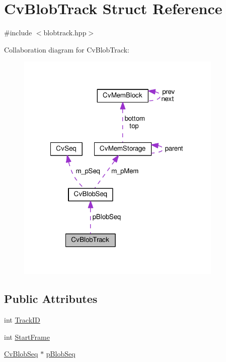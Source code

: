\hypertarget{structCvBlobTrack}{\section{Cv\-Blob\-Track Struct Reference}
\label{structCvBlobTrack}
}


{\ttfamily \#include $<$blobtrack.\-hpp$>$}



Collaboration diagram for Cv\-Blob\-Track\-:\nopagebreak
\begin{figure}[H]
\begin{center}
\leavevmode
\includegraphics[width=278pt]{structCvBlobTrack__coll__graph}
\end{center}
\end{figure}
\subsection*{Public Attributes}
\begin{DoxyCompactItemize}
\item 
int \hyperlink{structCvBlobTrack_a3a52923de9b3558457416d5ec178a4c7}{Track\-I\-D}
\item 
int \hyperlink{structCvBlobTrack_aa97587940f8f77b8cbeb3592efb57ebf}{Start\-Frame}
\item 
\hyperlink{classCvBlobSeq}{Cv\-Blob\-Seq} $\ast$ \hyperlink{structCvBlobTrack_a713e6659dc983db58adddb5c902b5c9d}{p\-Blob\-Seq}
\end{DoxyCompactItemize}


